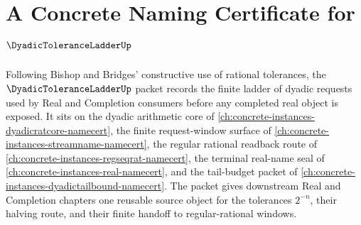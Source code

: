 \chapter{A Concrete Naming Certificate for $\DyadicToleranceLadderUp$}
\label{ch:concrete-instances-dyadic-tolerance-ladder-namecert}

Following Bishop and Bridges' constructive use of rational tolerances, the $\DyadicToleranceLadderUp$ packet records the finite ladder of dyadic requests used by Real and Completion consumers before any completed real object is exposed. It sits on the dyadic arithmetic core of \autoref{ch:concrete-instances-dyadicratcore-namecert}, the finite request-window surface of \autoref{ch:concrete-instances-streamname-namecert}, the regular rational readback route of \autoref{ch:concrete-instances-regseqrat-namecert}, the terminal real-name seal of \autoref{ch:concrete-instances-real-namecert}, and the tail-budget packet of \autoref{ch:concrete-instances-dyadictailbound-namecert}. The packet gives downstream Real and Completion chapters one reusable source object for the tolerances $2^{-n}$, their halving route, and their finite handoff to regular-rational windows.

